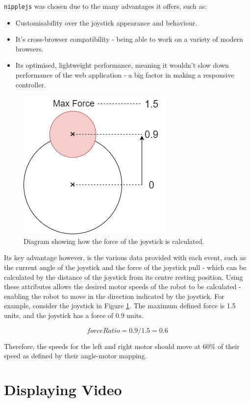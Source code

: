 \documentclass{l4proj}
\begin{document}
\lstinline{nipplejs} was chosen due to the many advantages it offers, such as:
\begin{itemize}
    \item Customisability over the joystick appearance and behaviour.
    \item It’s cross-browser compatibility - being able to work on a variety of modern browsers.
    \item Its optimised, lightweight performance, meaning it wouldn't slow down performance of the web application - a big factor in making a responsive controller.
\end{itemize}

\begin{figure}[!ht]
    \centering
    \includegraphics[width=0.35\linewidth]{images/joystick-force.png}
    \caption{Diagram showing how the force of the joystick is calculated.}
    \label{fig:joystick-force}
\end{figure}

Its key advantage however, is the various data provided with each event, such as the current angle of the joystick and the force of the joystick pull - which can be calculated by the  distance of the joystick from its centre resting position. Using these attributes allows the desired motor speeds of the robot to be calculated - enabling the robot to move in the direction indicated by the joystick. For example, consider the joystick in Figure \ref{fig:joystick-force}. The maximum defined force is 1.5 units, and the joystick has a force of 0.9 units.

\begin{equation}
   forceRatio = 0.9/1.5 = 0.6 
\end{equation}

Therefore, the speeds for the left and right motor should move at 60\% of their speed as defined by their angle-motor mapping.


\section{Displaying Video}
\end{document}
